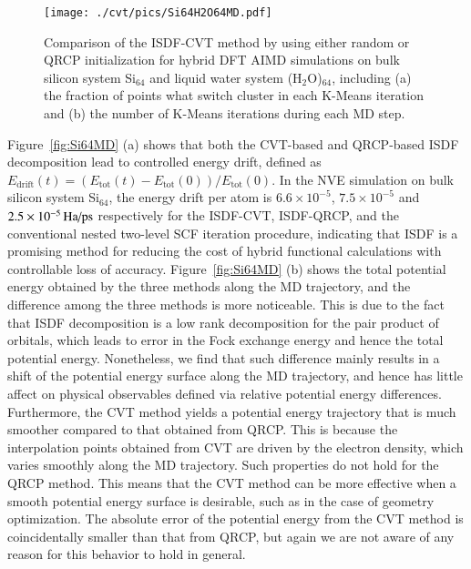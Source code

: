 \begin{figure}[htbp]
	\begin{center}
		\texttt{[image: ./cvt/pics/Si64H2O64MD.pdf]}
	\end{center}
	\caption{Comparison of the ISDF-CVT method by using either random or
	QRCP initialization for hybrid DFT AIMD simulations on bulk silicon
	system Si$_{64}$ and liquid water system (H$_2$O)$_{64}$, including
	(a) the fraction of points what switch cluster in each K-Means
	iteration and (b) the number of K-Means iterations during each MD
	step.}\label{fig:Si64H2O64MD}
\end{figure}

Figure~\ref{fig:Si64MD} (a) shows that both the CVT-based and QRCP-based ISDF
decomposition lead to controlled energy drift, defined as $E_{\mathrm{drift}}(t)
= (E_{\mathrm{tot}}(t)- E_{\mathrm{tot}}(0))/E_{\mathrm{tot}}(0)$. In the NVE
simulation on bulk silicon system Si$_{64}$, the energy drift per atom is $6.6
\times 10^{-5}$, $7.5 \times 10^{-5}$ and $2.5 \times 10^{-5}\HaPps$
respectively for the ISDF-CVT, ISDF-QRCP, and the conventional nested two-level
SCF iteration procedure, indicating that ISDF is a promising method for
reducing the cost of hybrid functional calculations with controllable loss of
accuracy. Figure~\ref{fig:Si64MD} (b) shows the total potential energy obtained
by the three methods along the MD trajectory, and the difference among the three
methods is more noticeable. This is due to the fact that ISDF decomposition is a
low rank decomposition for the pair product of orbitals, which leads to error in
the Fock exchange energy and hence the total potential energy. Nonetheless, we
find that such difference mainly results in a shift of the potential energy
surface along the MD trajectory, and hence has little affect on physical
observables defined via relative potential energy differences. Furthermore, the
CVT method yields a potential energy trajectory that is much smoother compared
to that obtained from QRCP. This is because the interpolation points obtained
from CVT are driven by the electron density, which varies smoothly along the MD
trajectory. Such properties do not hold for the QRCP method. This means that the
CVT method can be more effective when a smooth potential energy surface is
desirable, such as in the case of geometry optimization. The absolute error of
the potential energy from the CVT method is coincidentally smaller than that
from QRCP, but again we are not aware of any reason for this behavior to hold in
general.


